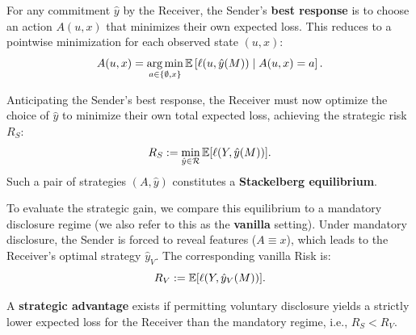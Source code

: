 For any commitment $\hat{y}$ by the Receiver, the Sender's \textbf{best response} is to choose an action $A(u, x)$ that minimizes their own expected loss. This reduces to a pointwise minimization for each observed state $(u, x)$:
\begin{equation}
    A(u, x) = \operatorname*{arg\,min}_{a \in \{\emptyset, x\}} \mathbb{E} \left[ \ell(u, \hat{y}(M)) \mid A(u, x)=a \right].
\end{equation}

Anticipating the Sender's best response, the Receiver must now optimize the choice of $\hat{y}$ to minimize their own total expected loss, achieving the strategic risk $R_S$:
\begin{equation}
    R_S := \min_{\hat{y} \in \mathcal{R}} \mathbb{E}[\ell(Y, \hat{y}(M))].
\end{equation}
Such a pair of strategies $(A, \hat{y})$ constitutes a \textbf{Stackelberg equilibrium}. 

To evaluate the strategic gain, we compare this equilibrium to a mandatory disclosure regime (we also refer to this as the \textbf{vanilla} setting). Under mandatory disclosure, the Sender is forced to reveal features ($A \equiv x$), which leads to the Receiver's optimal strategy $\hat{y}_V$. The corresponding vanilla Risk is:
\begin{equation}
    R_V := \mathbb{E}[\ell(Y, \hat{y}_V(M))].
\end{equation}

\begin{definition}
  A \textbf{strategic advantage} exists if permitting voluntary disclosure yields a strictly lower expected loss for the Receiver than the mandatory regime, i.e., $R_S < R_V$.
\end{definition}
